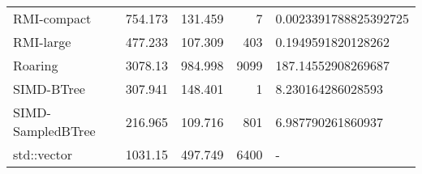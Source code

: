 \begin{tabular}{lrrrl}
 RMI-compact       &                754.173 &               131.459 &            7 & 0.0023391788825392725 \\
 RMI-large         &                477.233 &               107.309 &          403 & 0.1949591820128262    \\
 Roaring           &               3078.13  &               984.998 &         9099 & 187.14552908269687    \\
 SIMD-BTree        &                307.941 &               148.401 &            1 & 8.230164286028593     \\
 SIMD-SampledBTree &                216.965 &               109.716 &          801 & 6.987790261860937     \\
 std::vector       &               1031.15  &               497.749 &         6400 & -                     \\
\hline
\end{tabular}
